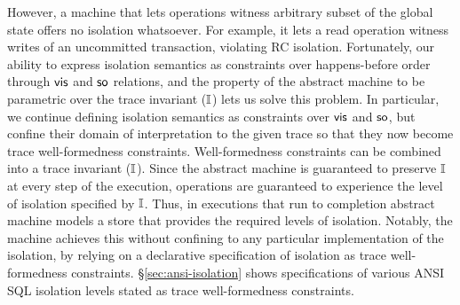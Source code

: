 However, a machine that lets operations witness arbitrary subset of
the global state offers no isolation whatsoever. For example, it lets
a read operation witness writes of an uncommitted transaction,
violating RC isolation. Fortunately, our ability to express isolation
semantics as constraints over happens-before order through $\textsf{vis}$ and
$\textsf{so}$ relations, and the property of the abstract machine to be
parametric over the trace invariant ($\mathbb{I}$) lets us solve this problem.
In particular, we continue defining isolation semantics as constraints
over $\textsf{vis}$ and $\textsf{so}$, but confine their domain of interpretation to
the given trace so that they now become trace well-formedness
constraints. Well-formedness constraints can be combined into a trace
invariant ($\mathbb{I}$). Since the abstract machine is guaranteed to preserve
$\mathbb{I}$ at every step of the execution, operations are guaranteed to
experience the level of isolation specified by $\mathbb{I}$.  Thus, in
executions that run to completion abstract machine models a store that
provides the required levels of isolation. Notably, the machine
achieves this without confining to any particular implementation of
the isolation, by relying on a declarative specification of isolation
as trace well-formedness constraints.  \S\ref{sec:ansi-isolation}
shows specifications of various ANSI SQL isolation levels stated as
trace well-formedness constraints.

